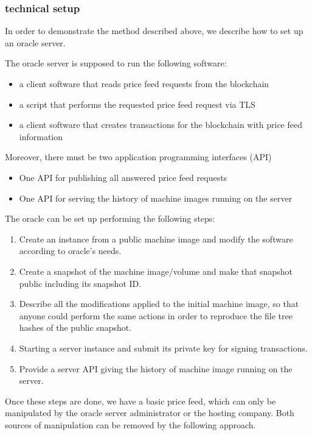 \documentclass[a4paper]{article}
\begin{document}
\subsubsection{technical setup}
In order to demonstrate the method described above, we describe how to set up an oracle server.

The oracle server is supposed to run the following software:

\begin{itemize}
\item a client software that reads price feed requests from the blockchain
\item a script that performs the requested price feed request via TLS
\item a client software that creates transactions for the blockchain with price feed information
\end{itemize}

Moreover, there must be two application programming interfaces (API) 
\begin{itemize}
\item One API for publishing all answered price feed requests
\item One API for serving the history of machine images running on the server
\end{itemize}

The oracle can be set up performing the following steps:

\begin{enumerate}
\item Create an instance from a public machine image and modify the software according to oracle's needs. 
\item Create a snapshot of the machine image/volume and make that snapshot public including its snapshot ID.
\item Describe all the modifications applied to the initial machine image, so that anyone could perform the same actions in order to reproduce the file tree hashes of the public snapshot.
\item Starting a server instance and submit its private key for signing transactions.
\item Provide a server API giving the history of machine image running on the server.
\end{enumerate}

Once these steps are done, we have a basic price feed, which can only be manipulated by the oracle server administrator or the hosting company. Both sources of manipulation can be removed by the following approach.
\end{document}
